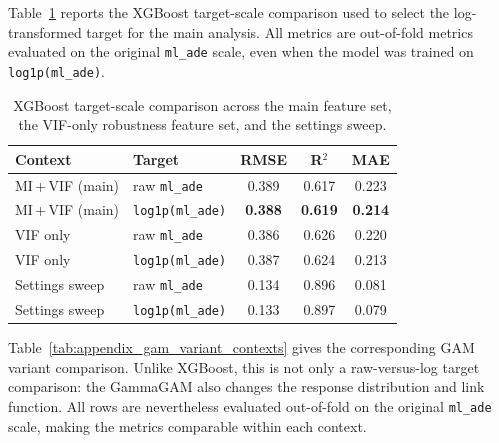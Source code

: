 \documentclass[12pt]{article}
\begin{document}
Table~\ref{tab:appendix_xgboost_target_scale} reports the XGBoost target-scale comparison used to select the log-transformed target for the main analysis. All metrics are out-of-fold metrics evaluated on the original \texttt{ml\_ade} scale, even when the model was trained on \texttt{log1p(ml\_ade)}.

\begin{table}[H]
  \centering
  \caption[XGBoost target-scale comparison]{XGBoost target-scale comparison across the main feature set, the VIF-only robustness feature set, and the settings sweep.}
  \label{tab:appendix_xgboost_target_scale}
  \footnotesize
  \renewcommand{\arraystretch}{1.12}
  \begin{tabular}{llccc}
    \toprule
    \textbf{Context} & \textbf{Target} & \textbf{RMSE} & \textbf{R$^2$} & \textbf{MAE} \\
    \midrule
    MI\,+\,VIF (main) & raw \texttt{ml\_ade} & 0.389 & 0.617 & 0.223 \\
    MI\,+\,VIF (main) & \texttt{log1p(ml\_ade)} & \textbf{0.388} & \textbf{0.619} & \textbf{0.214} \\
    VIF only & raw \texttt{ml\_ade} & 0.386 & 0.626 & 0.220 \\
    VIF only & \texttt{log1p(ml\_ade)} & 0.387 & 0.624 & 0.213 \\
    Settings sweep & raw \texttt{ml\_ade} & 0.134 & 0.896 & 0.081 \\
    Settings sweep & \texttt{log1p(ml\_ade)} & 0.133 & 0.897 & 0.079 \\
    \bottomrule
  \end{tabular}
\end{table}

Table~\ref{tab:appendix_gam_variant_contexts} gives the corresponding GAM variant comparison. Unlike XGBoost, this is not only a raw-versus-log target comparison: the GammaGAM also changes the response distribution and link function. All rows are nevertheless evaluated out-of-fold on the original \texttt{ml\_ade} scale, making the metrics comparable within each context.
\end{document}
